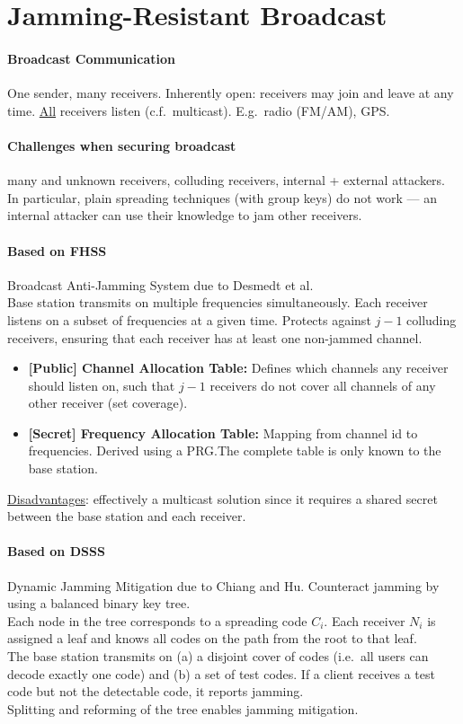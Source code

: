 \section{Jamming-Resistant Broadcast}

\paragraph{Broadcast Communication}
One sender, many receivers. Inherently open: receivers may join and leave at any time. \underline{All} receivers listen (c.f.\ multicast). E.g.\ radio (FM/AM), GPS.\@

\paragraph{Challenges when securing broadcast}
many and unknown receivers, colluding receivers, internal + external attackers.
In particular, plain spreading techniques (with group keys) do not work --- an internal attacker can use their knowledge to jam other receivers.

\paragraph{Based on FHSS}
Broadcast Anti-Jamming System due to Desmedt et al. \\
Base station transmits on multiple frequencies simultaneously.
Each receiver listens on a subset of frequencies at a given time.
Protects against $j-1$ colluding receivers, ensuring that each receiver has at least one non-jammed channel.

\begin{itemize}
	\item \textbf{[Public] Channel Allocation Table:}
	Defines which channels any receiver should listen on, such that $j-1$ receivers do not cover all channels of any other receiver (set coverage).
	\item \textbf{[Secret] Frequency Allocation Table:}
	Mapping from channel id to frequencies. Derived using a PRG.\@ The complete table is only known to the base station.
\end{itemize}

\underline{Disadvantages}:
effectively a multicast solution since it requires a shared secret between the base station and each receiver.

\paragraph{Based on DSSS}
Dynamic Jamming Mitigation due to Chiang and Hu.
Counteract jamming by using a balanced binary key tree.
\\
Each node in the tree corresponds to a spreading code $C_i$.
Each receiver $N_i$ is assigned a leaf and knows all codes on the path from the root to that leaf.
\\
The base station transmits on (a) a disjoint cover of codes (i.e.\ all users can decode exactly one code) and (b) a set of test codes.
If a client receives a test code but not the detectable code, it reports jamming.
\\
Splitting and reforming of the tree enables jamming mitigation.

